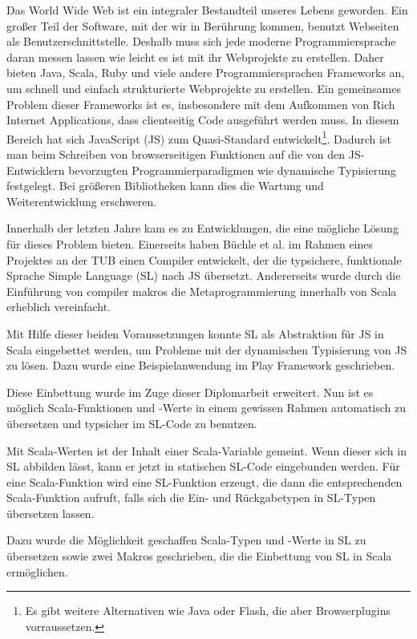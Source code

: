 \documentclass[12pt,bibtotoc]{scrreprt}
\begin{document}
Das World Wide Web ist ein integraler Bestandteil unseres Lebens geworden. Ein großer Teil der Software, mit der wir in Berührung kommen, benutzt Webseiten als Benutzerschnittstelle. Deshalb muss sich jede moderne Programmiersprache daran messen lassen wie leicht es ist mit ihr Webprojekte zu erstellen. Daher bieten Java, Scala, Ruby und viele andere Programmiersprachen Frameworks an, um schnell und einfach strukturierte Webprojekte zu erstellen. Ein gemeinsames Problem dieser Frameworks ist es, insbesondere mit dem Aufkommen von Rich Internet Applications, dass clientseitig Code ausgeführt werden muss. In diesem Bereich hat sich JavaScript (JS) zum Quasi-Standard entwickelt\footnote{Es gibt weitere Alternativen wie Java oder Flash, die aber Browserplugins vorraussetzen.}. Dadurch ist man beim Schreiben von browserseitigen Funktionen auf die von den JS-Entwicklern bevorzugten Programmierparadigmen wie dynamische Typisierung festgelegt. Bei größeren Bibliotheken kann dies die Wartung und Weiterentwicklung erschweren.

Innerhalb der letzten Jahre kam es zu Entwicklungen, die eine mögliche Lösung für dieses Problem bieten. Einerseits haben Büchle et al. im Rahmen eines Projektes an der \ac{TUB} einen Compiler entwickelt, der die typsichere, funktionale Sprache Simple Language (SL) nach JS übersetzt\cite{Buchle2013}. Andererseits wurde durch die Einführung von compiler makros \cite{Burmako2013} die Metaprogrammierung innerhalb von Scala erheblich vereinfacht.

Mit Hilfe dieser beiden Voraussetzungen konnte SL als Abstraktion für JS in Scala eingebettet werden\cite{Hoger2013}, um Probleme mit der dynamischen Typisierung von JS zu lösen. Dazu wurde eine Beispielanwendung im Play Framework geschrieben\cite{Play1}. 

Diese Einbettung wurde im Zuge dieser Diplomarbeit erweitert. Nun ist es  möglich Scala-Funktionen und -Werte in einem gewissen Rahmen automatisch zu übersetzen und typsicher im SL-Code zu benutzen. 

Mit Scala-Werten ist der Inhalt einer Scala-Variable gemeint. Wenn dieser sich in SL abbilden lässt, kann er jetzt in statischen SL-Code eingebunden werden. Für eine Scala-Funktion wird eine SL-Funktion erzeugt, die dann die entsprechenden Scala-Funktion aufruft, falls sich die Ein- und Rückgabetypen in SL-Typen übersetzen lassen.

Dazu wurde die Möglichkeit geschaffen Scala-Typen und -Werte in SL zu übersetzen sowie zwei Makros geschrieben, die die Einbettung von SL in Scala ermöglichen. 
\end{document}
